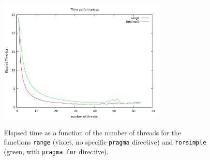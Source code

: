 \documentclass[11pt,a4paper]{article}
\begin{document}
\begin{figure}[h!]
	\centering
	\includegraphics[width=0.75\textwidth]{../Images/Performance.pdf}
	\label{fig:loop}
	\cprotect\caption{Elapsed time as a function of the number of threads for the functions \verb+range+ (violet, no specific \verb+pragma+ directive) and \verb+forsimple+ (green, with \verb+pragma for+ directive).}
\end{figure}
\end{document}
